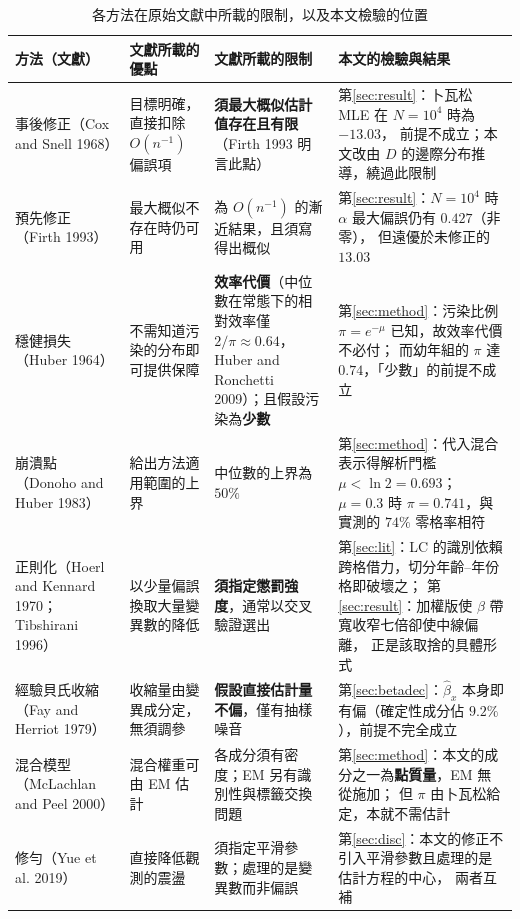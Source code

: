\documentclass[UTF8, fontset=macnew, a4paper, 12pt]{ctexart}
\begin{document}
\begin{table}[H]
\centering
\caption{各方法在原始文獻中所載的限制，以及本文檢驗的位置}
\footnotesize
\renewcommand{\arraystretch}{1.3}
\begin{tabular}{p{2.6cm}p{3.5cm}p{3.6cm}p{4.0cm}}
\toprule
方法（文獻） & 文獻所載的優點 & 文獻所載的限制 & 本文的檢驗與結果\\
\midrule
事後修正\newline（Cox and Snell 1968）
& 目標明確，直接扣除 $O(n^{-1})$ 偏誤項
& \textbf{須最大概似估計值存在且有限}（Firth 1993 明言此點）
& 第\ref{sec:result}：卜瓦松 MLE 在 $N=10^4$ 時為 $-13.03$，
  前提不成立；本文改由 $D$ 的邊際分布推導，繞過此限制\\
預先修正\newline（Firth 1993）
& 最大概似不存在時仍可用
& 為 $O(n^{-1})$ 的漸近結果，且須寫得出概似
& 第\ref{sec:result}：$N=10^4$ 時 $\alpha$ 最大偏誤仍有 $0.427$（非零），
  但遠優於未修正的 $13.03$\\
穩健損失\newline（Huber 1964）
& 不需知道污染的分布即可提供保障
& \textbf{效率代價}（中位數在常態下的相對效率僅 $2/\pi\approx0.64$，
  Huber and Ronchetti 2009）；且假設污染為\textbf{少數}
& 第\ref{sec:method}：污染比例 $\pi=e^{-\mu}$ 已知，故效率代價不必付；
  而幼年組的 $\pi$ 達 $0.74$，「少數」的前提不成立\\
崩潰點\newline（Donoho and Huber 1983）
& 給出方法適用範圍的上界
& 中位數的上界為 $50\%$
& 第\ref{sec:method}：代入混合表示得解析門檻 $\mu<\ln2=0.693$；
  $\mu=0.3$ 時 $\pi=0.741$，與實測的 $74\%$ 零格率相符\\
正則化\newline（Hoerl and Kennard 1970；Tibshirani 1996）
& 以少量偏誤換取大量變異數的降低
& \textbf{須指定懲罰強度}，通常以交叉驗證選出
& 第\ref{sec:lit}：LC 的識別依賴跨格借力，切分年齡--年份格即破壞之；
  第\ref{sec:result}：加權版使 $\beta$ 帶寬收窄七倍卻使中線偏離，
  正是該取捨的具體形式\\
經驗貝氏收縮\newline（Fay and Herriot 1979）
& 收縮量由變異成分定，無須調參
& \textbf{假設直接估計量不偏}，僅有抽樣噪音
& 第\ref{sec:betadec}：$\hat\beta_x$ 本身即有偏（確定性成分佔
  $9.2\%$），前提不完全成立\\
混合模型\newline（McLachlan and Peel 2000）
& 混合權重可由 EM 估計
& 各成分須有密度；EM 另有識別性與標籤交換問題
& 第\ref{sec:method}：本文的成分之一為\textbf{點質量}，EM 無從施加；
  但 $\pi$ 由卜瓦松給定，本就不需估計\\
修勻\newline（Yue et al. 2019）
& 直接降低觀測的震盪
& 須指定平滑參數；處理的是變異數而非偏誤
& 第\ref{sec:disc}：本文的修正不引入平滑參數且處理的是估計方程的中心，
  兩者互補\\
\bottomrule
\end{tabular}
\label{tab:limits}
\end{table}
\end{document}
